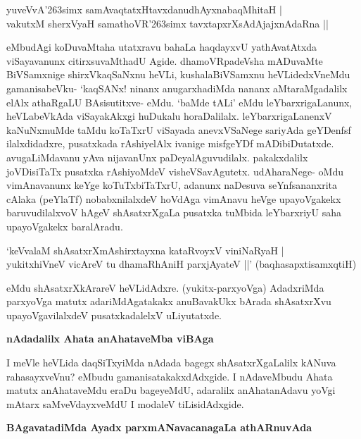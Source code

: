 \begin{shloka}
yuveVvA\char'263simx samAvaqtatxHtavxdanudhAyxnabaqMhitaH |\\
vakutxM sherxVyaH samathoVR\char'263simx tavxtapxrXsAdAjajxnAdaRna ||
\end{shloka}

eMbudAgi koDuvaMtaha utatxravu bahaLa haqdayxvU yathAvatAtxda viSayavanunx citirxsuvaMthadU Agide. dhamoVRpadeVsha mADuvaMte BiVSamxnige shirxVkaqSaNxnu heVLi, kushalaBiVSamxnu heVLidedxVneMdu gamanisabeVku- `kaqSANx! ninanx anugarxhadiMda nananx aMtaraMgadalilx elAlx athaRgaLU BAsisutitxve- eMdu. `baMde tALi' eMdu leYbarxrigaLanunx, heVLabeVkAda viSayakAkxgi huDukalu horaDalilalx. leYbarxrigaLanenxV kaNuNxmuMde taMdu koTaTxrU viSayada anevxVSaNege sariyAda geYDenfsf ilalxdidadxre, pusatxkada rAshiyelAlx ivanige misfgeYDf mADibiDutatxde. avugaLiMdavanu yAva nijavanUnx paDeyalAguvudilalx. pakakxdalilx joVDisiTaTx pusatxka rAshiyoMdeV visheVSavAgutetx. udAharaNege- oMdu vimAnavanunx keYge koTuTxbiTaTxrU, adanunx naDesuva seYnfsananxrita cAlaka (peYlaTf) nobabxnilalxdeV hoVdAga vimAnavu heVge upayoVgakekx baruvudilalxvoV hAgeV shAsatxrXgaLa pusatxka tuMbida leYbarxriyU saha upayoVgakekx baralAradu.

\begin{shloka}
`keVvalaM shAsatxrXmAshirxtayxna kataRvoyxV viniNaRyaH |\\\label{164}
yukitxhiVneV vicAreV tu dhamaRhAniH parxjAyateV ||' \quad(baqhasapxtisamxqtiH)
\end{shloka}

eMdu shAsatxrXkArareV heVLidAdxre. (yukitx-parxyoVga) AdadxriMda parxyoVga matutx adariMdAgatakakx anuBavakUkx bArada shAsatxrXvu upayoVgavilalxdeV pusatxkadalelxV uLiyutatxde.

\noindent
{\bf\large{nAdadalilx Ahata anAhataveMba viBAga}}\label{page164}

I meVle heVLida daqSiTxyiMda nAdada bagegx shAsatxrXgaLalilx kANuva rahasayxveVnu? eMbudu gamanisatakakxdAdxgide. I nAdaveMbudu Ahata matutx anAhataveMdu eraDu bageyeMdU, adaralilx anAhatanAdavu yoVgi mAtarx saMveVdayxveMdU I modaleV tiLisidAdxgide.

\noindent
{\bf\large{BAgavatadiMda Ayadx parxmANavacanagaLa athARnuvAda}}\label{page164}


